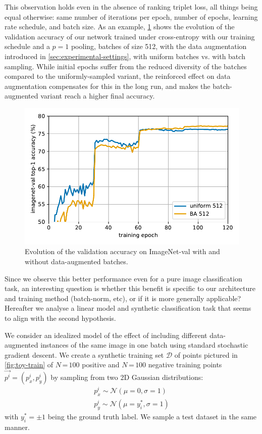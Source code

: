 This observation holds even in the absence of ranking triplet loss, all things being equal otherwise: same number of iterations per epoch, number of epochs, learning rate schedule, and batch size. 
As an example, \cref{fig:suppl-compare-sampling} shows the evolution of the validation accuracy of our network trained under cross-entropy with our training schedule and a $p = 1$ pooling, batches of size 512, with the data augmentation introduced in \cref{sec:experimental-settings}, with uniform batches vs. with batch sampling. 
While initial epochs suffer from the reduced diversity of the batches compared to the uniformly-sampled variant, the reinforced effect on data augmentation compensates for this in the long run, and makes the batch-augmented variant reach a higher final accuracy. 
\begin{figure}
\includegraphics[width=\linewidth]{figs/conv_BA_plot/conv_BA_plot}
\caption{\label{fig:suppl-compare-sampling}
	Evolution of the validation accuracy on ImageNet-val with and without data-augmented batches. 
}
\end{figure}

Since we observe this better performance even for a pure image classification task, an interesting question is whether this benefit is specific to our architecture and training method (batch-norm, etc), or if it is more generally applicable? 
Hereafter we analyse a linear model and synthetic classification task that seems to align with the second hypothesis. 

%

We consider an idealized model of the effect of including different data-augmented instances of the same image in one batch using standard stochastic gradient descent. 
We create a synthetic training set $\mathcal{D}$ of points pictured in \cref{fig:toy-train} of $N$\,=\,$100$ positive and $N$\,=\,$100$ negative training points $\vec{p^i} = (p^i_x, p^i_y)$ by sampling from two 2D Gaussian distributions: 
\begin{equation}
\begin{aligned}
    p_x^i \sim \mathcal{N}(\mu=0, \sigma=1) \\
    p_y^i \sim \mathcal{N}(\mu=y_i^*, \sigma=1)
\end{aligned}
\end{equation}
with $y_i^* = \pm 1$ being the ground truth label. 
We sample a test dataset in the same manner. 

